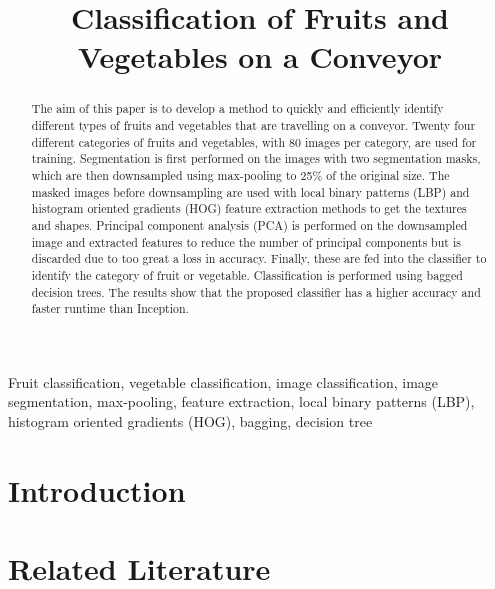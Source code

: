 \documentclass[conference,table]{IEEEtran}
\begin{document}
	
	\title{Classification of Fruits and Vegetables on a Conveyor}
	\author{
	}
	
	\maketitle
	
	\begin{abstract}
		The aim of this paper is to develop a method to quickly and efficiently identify different types of fruits and vegetables that are travelling on a conveyor. Twenty four different categories of fruits and vegetables, with 80 images per category, are used for training. Segmentation is first performed on the images with two segmentation masks, which are then downsampled using max-pooling to 25\% of the original size. The masked images before downsampling are used with local binary patterns (LBP) and histogram oriented gradients (HOG) feature extraction methods to get the textures and shapes. Principal component analysis (PCA) is performed on the downsampled image and extracted features to reduce the number of principal components but is discarded due to too great a loss in accuracy. Finally, these are fed into the classifier to identify the category of fruit or vegetable. Classification is performed using bagged decision trees. The results show that the proposed classifier has a higher accuracy and faster runtime than Inception.
	\end{abstract}
	
	\begin{IEEEkeywords}
		Fruit classification, vegetable classification, image classification, image segmentation, max-pooling, feature extraction, local binary patterns (LBP), histogram oriented gradients (HOG), bagging, decision tree
	\end{IEEEkeywords}
	
	\section{Introduction}
	
	
	\section{Related Literature}
	
	
\end{document}
